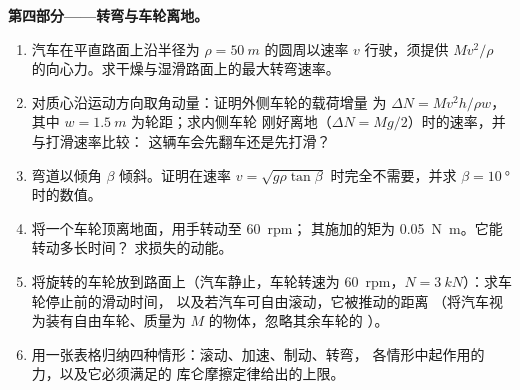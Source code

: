 \begin{problem}
\medskip
\noindent\textbf{第四部分——转弯与车轮离地。}
\begin{enumerate}[resume]
  \item 汽车在平直路面上沿半径为
        $\rho = \qty{50}{m}$ 的圆周以速率 $v$ 行驶，须提供
        $Mv^2/\rho$ 的向心力。求干燥与湿滑路面上的最大转弯速率。
  \item 对质心沿运动方向取角动量：证明外侧车轮的载荷增量
        为 $\Delta N =
        Mv^2h/\rho w$，其中 $w = \qty{1.5}{m}$ 为轮距；求内侧车轮
        刚好离地（$\Delta N = Mg/2$）时的速率，并与打滑速率比较：
        这辆车会先翻车还是先打滑？
  \item 弯道以倾角 $\beta$ 倾斜。证明在速率
        $v = \sqrt{g\rho\tan\beta}$ 时完全不需要，并求
        $\beta = \qty{10}{\degree}$ 时的数值。
  \item 将一个车轮顶离地面，用手转动至 \qty{60}{rpm}；
        其施加的矩为 \qty{0.05}{N.m}。它能转动多长时间？
        求损失的动能。
  \item 将旋转的车轮放到路面上（汽车静止，车轮转速为
        \qty{60}{rpm}，$N = \qty{3}{kN}$）：求车轮停止前的滑动时间，
        以及若汽车可自由滚动，它被推动的距离
        （将汽车视为装有自由车轮、质量为 $M$ 的物体，忽略其余车轮的
        ）。
  \item 用一张表格归纳四种情形：滚动、加速、制动、转弯，
        各情形中起作用的力，以及它必须满足的
        库仑摩擦定律给出的上限。
\end{enumerate}
\end{problem}
